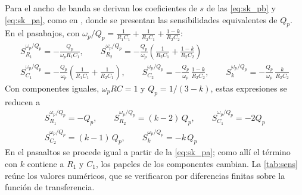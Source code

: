 Para el ancho de banda se derivan los coeficientes de $s$ de las \autoref{eq:sk_pb} y \autoref{eq:sk_pa}, como en \cite[sec.~8.2, ec.~8.9]{daryanani}, donde se presentan las sensibilidades equivalentes de $Q_p$. En el pasabajos, con $\omega_p/Q_p = \frac{1}{R_1 C_1} + \frac{1}{R_2 C_1} + \frac{1-k}{R_2 C_2}$:
\begin{gather}
    S_{R_1}^{\omega_p/Q_p} = -\frac{Q_p}{\omega_p R_1 C_1}, \qquad
    S_{R_2}^{\omega_p/Q_p} = -\frac{Q_p}{\omega_p}\left(\frac{1}{R_2 C_1} + \frac{1-k}{R_2 C_2}\right) \\
    S_{C_1}^{\omega_p/Q_p} = -\frac{Q_p}{\omega_p}\left(\frac{1}{R_1 C_1} + \frac{1}{R_2 C_1}\right), \qquad
    S_{C_2}^{\omega_p/Q_p} = -\frac{Q_p}{\omega_p} \, \frac{1-k}{R_2 C_2}, \qquad
    S_{k}^{\omega_p/Q_p} = -\frac{Q_p}{\omega_p} \, \frac{k}{R_2 C_2}
\end{gather}
Con componentes iguales, $\omega_p RC = 1$ y $Q_p = 1/(3-k)$, estas expresiones se reducen a
\begin{gather}
    S_{R_1}^{\omega_p/Q_p} = -Q_p, \qquad
    S_{R_2}^{\omega_p/Q_p} = (k-2) \, Q_p, \qquad
    S_{C_1}^{\omega_p/Q_p} = -2Q_p \\
    S_{C_2}^{\omega_p/Q_p} = (k-1) \, Q_p, \qquad
    S_{k}^{\omega_p/Q_p} = -k \, Q_p
\end{gather}
En el pasaaltos se procede igual a partir de la \autoref{eq:sk_pa}; como allí el término con $k$ contiene a $R_1$ y $C_1$, los papeles de los componentes cambian. La \autoref{tab:sens} reúne los valores numéricos, que se verificaron por diferencias finitas sobre la función de transferencia.

